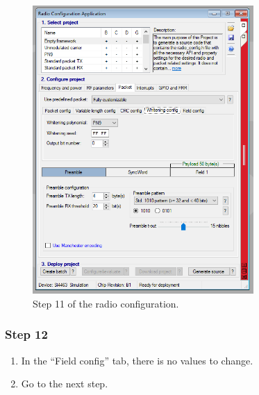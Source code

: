 \begin{figure}[!h]
	\begin{center}
		\includegraphics[width=0.75\textwidth]{figures/wds-tutorial/wds-tutorial-11.png}
		\caption{Step 11 of the radio configuration.}
		\label{fig:wds-tutorial-step-11}
	\end{center}
\end{figure}

\subsubsection{Step 12}

\begin{enumerate}
    \item In the ``Field config'' tab, there is no values to change.
    \item Go to the next step.
\end{enumerate}

